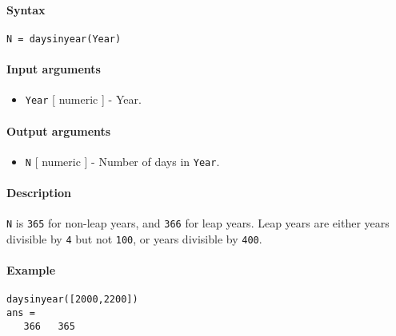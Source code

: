


	\paragraph{Syntax}

\begin{verbatim}
N = daysinyear(Year)
\end{verbatim}

\paragraph{Input arguments}

\begin{itemize}
\itemsep1pt\parskip0pt
\item
  \texttt{Year} {[} numeric {]} - Year.
\end{itemize}

\paragraph{Output arguments}

\begin{itemize}
\itemsep1pt\parskip0pt
\item
  \texttt{N} {[} numeric {]} - Number of days in \texttt{Year}.
\end{itemize}

\paragraph{Description}

\texttt{N} is \texttt{365} for non-leap years, and \texttt{366} for leap
years. Leap years are either years divisible by \texttt{4} but not
\texttt{100}, or years divisible by \texttt{400}.

\paragraph{Example}

\begin{verbatim}
daysinyear([2000,2200])
ans =
   366   365
\end{verbatim}


